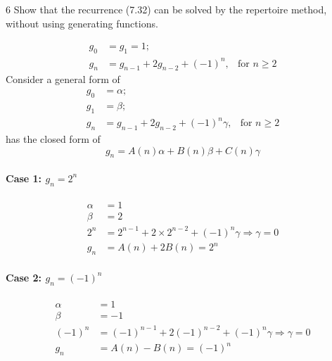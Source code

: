 \documentclass[a4paper,12pt]{article}
\makeatletter
\newtheorem*{solution}{Solution}
\theoremstyle{definition}
\renewenvironment{solution}[1][Solution] {\par\pushQED{\qed}\normalfont\topsep6\p@\@plus6\p@\relax\trivlist\item[\hskip\labelsep\bfseries#1\@addpunct{.}]\ignorespaces}{\popQED\endtrivlist\@endpefalse} \makeatother
\newenvironment{problems}{\begin{list}{}{\renewcommand{\makelabel}[1]{\textbf{##1}\hfil}}}{\end{list}}
\makeatother
\begin{document}
\begin{problems}
    \item[6] Show that the recurrence (7.32) can be solved by the repertoire method, without using generating functions.
    \begin{solution}
        \begin{align*}
            g_0 &= g_1 = 1;\\
            g_n &= g_{n-1} + 2g_{n-2} + (-1)^n, & \text{for }n\geq 2
        \end{align*}
        Consider a general form of
        \begin{align*}
            g_0 &= \alpha;\\
            g_1 &= \beta; \\
            g_n &= g_{n-1} + 2g_{n-2} + (-1)^n\gamma, & \text{for }n\geq 2
        \end{align*}
        has the closed form of
        \begin{equation*}
            g_n = A(n)\alpha + B(n)\beta + C(n)\gamma
        \end{equation*}
        \paragraph{Case 1: $g_n = 2^n$}
        \begin{align}
            \alpha &= 1 \nonumber\\
            \beta &= 2 \nonumber\\
            2^n &= 2^{n-1} + 2\times 2^{n-2} + (-1)^n \gamma \Rightarrow \gamma = 0 \nonumber\\
            g_n &= A(n) + 2B(n) = 2^n \label{eq:1}
        \end{align}
        \paragraph{Case 2: $g_n=(-1)^n$} 
        \begin{align}
            \alpha &= 1  \nonumber\\
            \beta &= -1  \nonumber\\
            (-1)^n &= (-1)^{n-1} + 2(-1)^{n-2} + (-1)^n\gamma \Rightarrow \gamma = 0 \nonumber\\
            g_n &= A(n) - B(n) = (-1)^n  \label{eq:2}
        \end{align}

\end{solution}
\end{problems}
\end{document}
